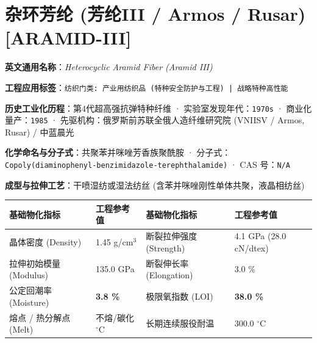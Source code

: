 \documentclass[11pt,openright,twoside,UTF8]{ctexbook}
\begin{document}
\section{杂环芳纶 (芳纶III / Armos / Rusar) [ARAMID-III]}
\label{sec:aramid-iii}

\noindent\textbf{英文通用名称}：\textit{Heterocyclic Aramid Fiber (Aramid III)}\par
\noindent\textbf{工程应用标签}：\texttt{纺织门类: 产业用纺织品 (特种安全防护与工程) | 战略特种高性能}\par
\noindent\textbf{历史工业化历程}：第4代超高强抗弹特种纤维 · 实验室发现年代：\texttt{1970s} · 商业化量产：\texttt{1985} · 先驱机构：俄罗斯前苏联全俄人造纤维研究院 (VNIISV / Armos, Rusar) / 中蓝晨光\par
\noindent\textbf{化学命名与分子式}：共聚苯并咪唑芳香族聚酰胺 · 分子式：\texttt{Copoly(diaminophenyl-benzimidazole-terephthalamide)} · CAS 号：\texttt{N/A}\par
\noindent\textbf{成型与拉伸工艺}：干喷湿纺或湿法纺丝 (含苯并咪唑刚性单体共聚，液晶相纺丝)\par

\vspace{0.15cm}
\begin{center}
\small
\begin{tabularx}{\textwidth}{p{3.8cm}Xp{3.8cm}X}
\toprule
\textbf{基础物化指标} & \textbf{工程参考值} & \textbf{基础物化指标} & \textbf{工程参考值} \\
\midrule
晶体密度 (Density) & 1.45 g/cm$^3$ & 断裂拉伸强度 (Strength) & 4.1 GPa (28.0 cN/dtex) \\
拉伸初始模量 (Modulus) & 135.0 GPa & 断裂伸长率 (Elongation) & 3.0 \% \\
公定回潮率 (Moisture) & \textbf{3.8 \%} & 极限氧指数 (LOI) & \textbf{38.0 \%} \\
熔点 / 热分解点 (Melt) & 不熔/碳化 $^\circ\mathrm{C}$ & 长期连续服役耐温 & 300.0 $^\circ\mathrm{C}$ \\
\bottomrule
\end{tabularx}
\end{center}
\vspace{0.15cm}
\end{document}
